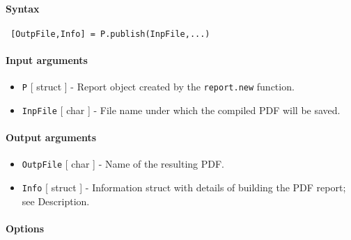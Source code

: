 


	\paragraph{Syntax}
 
 \begin{verbatim}
 [OutpFile,Info] = P.publish(InpFile,...)
 \end{verbatim}
 
 \paragraph{Input arguments}
 
 \begin{itemize}
 \item
   \texttt{P} {[} struct {]} - Report object created by the
   \texttt{report.new} function.
 \item
   \texttt{InpFile} {[} char {]} - File name under which the compiled PDF
   will be saved.
 \end{itemize}
 
 \paragraph{Output arguments}
 
 \begin{itemize}
 \item
   \texttt{OutpFile} {[} char {]} - Name of the resulting PDF.
 \item
   \texttt{Info} {[} struct {]} - Information struct with details of
   building the PDF report; see Description.
 \end{itemize}
 
 \paragraph{Options}
 
